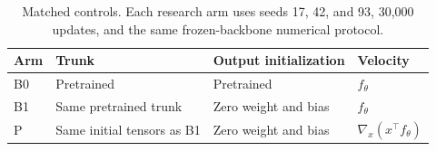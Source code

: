 \begin{table}[!htbp]
\centering
\begin{tabular}{llll}
\toprule Arm & Trunk & Output initialization & Velocity \\
\midrule B0 & Pretrained & Pretrained & $f_\theta$ \\
B1 & Same pretrained trunk & Zero weight and bias & $f_\theta$ \\
P & Same initial tensors as B1 & Zero weight and bias & $\nabla_x(x^\top f_\theta)$ \\
\bottomrule
\end{tabular}
\caption{Matched controls. Each research arm uses seeds 17, 42, and 93, 30,000 updates, and the same frozen-backbone numerical protocol.}
\label{tab:design}
\end{table}
